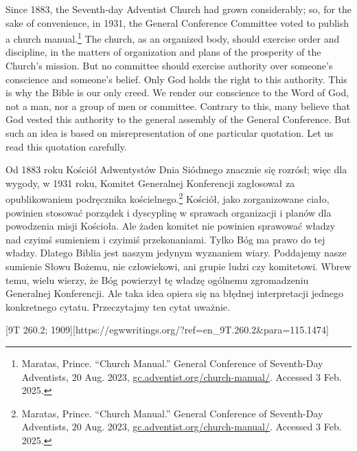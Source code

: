 Since 1883, the Seventh-day Adventist Church had grown considerably; so, for the sake of convenience, in 1931, the General Conference Committee voted to publish a church manual.\footnote{Maratas, Prince. “Church Manual.” General Conference of Seventh-Day Adventists, 20 Aug. 2023, \href{https://gc.adventist.org/church-manual/}{gc.adventist.org/church-manual/}. Accessed 3 Feb. 2025.} The church, as an organized body, should exercise order and discipline, in the matters of organization and plans of the prosperity of the Church's mission. But no committee should exercise authority over someone’s conscience and someone’s belief. Only God holds the right to this authority. This is why the Bible is our only creed. We render our conscience to the Word of God, not a man, nor a group of men or committee. Contrary to this, many believe that God vested this authority to the general assembly of the General Conference. But such an idea is based on misrepresentation of one particular quotation. Let us read this quotation carefully.


Od 1883 roku Kościół Adwentystów Dnia Siódmego znacznie się rozrósł; więc dla wygody, w 1931 roku, Komitet Generalnej Konferencji zagłosował za opublikowaniem podręcznika kościelnego.\footnote{Maratas, Prince. “Church Manual.” General Conference of Seventh-Day Adventists, 20 Aug. 2023, \href{https://gc.adventist.org/church-manual/}{gc.adventist.org/church-manual/}. Accessed 3 Feb. 2025.} Kościół, jako zorganizowane ciało, powinien stosować porządek i dyscyplinę w sprawach organizacji i planów dla powodzenia misji Kościoła. Ale żaden komitet nie powinien sprawować władzy nad czyimś sumieniem i czyimiś przekonaniami. Tylko Bóg ma prawo do tej władzy. Dlatego Biblia jest naszym jedynym wyznaniem wiary. Poddajemy nasze sumienie Słowu Bożemu, nie człowiekowi, ani grupie ludzi czy komitetowi. Wbrew temu, wielu wierzy, że Bóg powierzył tę władzę ogólnemu zgromadzeniu Generalnej Konferencji. Ale taka idea opiera się na błędnej interpretacji jednego konkretnego cytatu. Przeczytajmy ten cytat uważnie.


[9T 260.2; 1909][https://egwwritings.org/?ref=en\_9T.260.2&para=115.1474]


